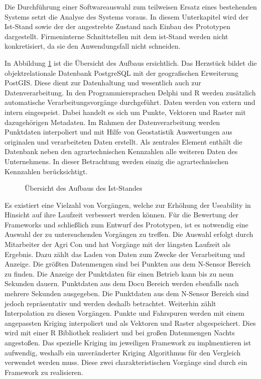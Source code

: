 Die Durchführung einer Softwareauswahl zum teilweisen Ersatz eines bestehenden Systems setzt die Analyse des Systems voraus.
In diesem Unterkapitel wird der Ist-Stand sowie der der angestrebte Zustand nach Einbau des Prototypen dargestellt.
Firmeninterne Schnittstellen mit dem ist-Stand werden nicht konkretisiert, da sie den Anwendungsfall nicht schneiden.

In Abbildung \ref{fig:iststand} ist die Übersicht des Aufbaus ersichtlich.
Das Herzstück bildet die objektrelationale Datenbank PostgreSQL mit der geografischen Erweiterung PostGIS.
Diese dient zur Datenhaltung und wesentlich auch zur Datenverarbeitung.
In den Programmiersprachen Delphi und R werden zusätzlich automatische Verarbeitungsvorgänge durchgeführt.
Daten werden von extern und intern eingespeist.
Dabei handelt es sich um Punkte, Vektoren und Raster mit dazugehörigen Metadaten.
Im Rahmen der Datenverarbeitung werden Punktdaten interpoliert und mit Hilfe von Geostatistik Auswertungen aus originalen und verarbeiteten Daten erstellt.
Als zentrales Element enthält die Datenbank neben den agrartechnischen Kennzahlen alle weiteren Daten des Unternehmens. In dieser Betrachtung werden einzig die agrartechnischen Kennzahlen berücksichtigt.
\begin{figure}[h]
\centering

\caption[Aufbau Ist-Stand]{\"{U}bersicht des Aufbaus des Ist-Standes}
\label{fig:iststand}
\end{figure}
%
\label{iststand-vorgaenge}

Es existiert eine Vielzahl von Vorgängen, welche zur Erhöhung der Useability in Hinsicht auf ihre Laufzeit verbessert werden können.
Für die Bewertung der Frameworks und schließlich zum Entwurf des Prototypen, ist es notwendig eine Auswahl der zu untersuchenden Vorgängen zu treffen.
Die Auswahl erfolgt durch Mitarbeiter der Agri Con und hat Vorgänge mit der längsten Laufzeit als Ergebnis.
Dazu zählt das Laden von Daten zum Zwecke der Verarbeitung und Anzeige.
Die größten Datenmengen sind bei Punkten aus dem N-Sensor Bereich zu finden.
Die Anzeige der Punktdaten für einen Betrieb kann bis zu neun Sekunden dauern.
Punktdaten aus dem Docu Bereich werden ebenfalls nach mehrere Sekunden ausgegeben.
Die Punktdaten aus dem N-Sensor Bereich sind jedoch repräsentativ und werden deshalb betrachtet.
Weiterhin zählt Interpolation zu diesen Vorgängen.
Punkte und Fahrspuren werden mit einem angepassten Kriging interpoliert und als Vektoren und Raster abgespeichert.
Dies wird mit einer R Bibliothek realisiert und bei großen Datenmengen Nachts angestoßen.
Das spezielle Kriging im jeweiligen Framework zu implmentieren ist aufwendig, weshalb ein unveränderter Kriging Algorithmus für den Vergleich verwendet werden muss.
Diese zwei charakteristischen Vorgänge sind durch ein Framework zu realisieren.


